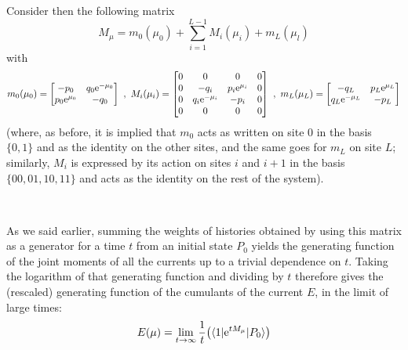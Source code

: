 \documentclass[aps,pre,onecolumn,showpacs,showkeys,a4paper]{revtex4-1}
\begin{document}
Consider then the following matrix
\begin{equation}\label{Mmu}
M_{\mu}=m_0(\mu_0)+\sum_{i=1}^{L-1} M_{i}(\mu_i)+m_L(\mu_l)
\end{equation}
with
\begin{equation}\label{Mmui}
m_0(\mu_0)=\begin{bmatrix} -p_0 & q_0{\rm e}^{-\mu_0} \\ p_0{\rm e}^{\mu_0} & -q_0  \end{bmatrix}~,~ M_{i}(\mu_i)=\begin{bmatrix} 0 & 0 & 0 & 0 \\ 0 & -q_i & p_i{\rm e}^{\mu_i} & 0 \\ 0 & q_i{\rm e}^{-\mu_i}& -p_i & 0 \\ 0 & 0 & 0 & 0 \end{bmatrix}~,~m_L(\mu_L)=\begin{bmatrix} -q_L & p_L{\rm e}^{\mu_L} \\  q_L{\rm e}^{-\mu_L} & -p_L  \end{bmatrix}
\end{equation}
(where, as before, it is implied that $m_0$ acts as written on site $0$ in the basis $\{0,1\}$ and as the identity on the other sites, and the same goes for $m_L$ on site $L$; similarly, $M_i$ is expressed by its action on sites $i$ and $i\!+\!1$ in the basis $\{00,01,10,11\}$ and acts as the identity on the rest of the system).

~

As we said earlier, summing the weights of histories obtained by using this matrix as a generator for a time $t$ from an initial state $P_0$ yields the generating function of the joint moments of all the currents up to a trivial dependence on $t$. Taking the logarithm of that generating function and dividing by $t$ therefore gives the (rescaled) generating function of the cumulants of the current $E$, in the limit of large times:
\begin{equation}\label{Emui}
E(\mu)=\lim\limits_{t\rightarrow\infty}\frac{1}{t}\bigl( \langle 1|{\rm e}^{tM_{\mu}}|P_0\rangle \bigr)
\end{equation}
\end{document}
